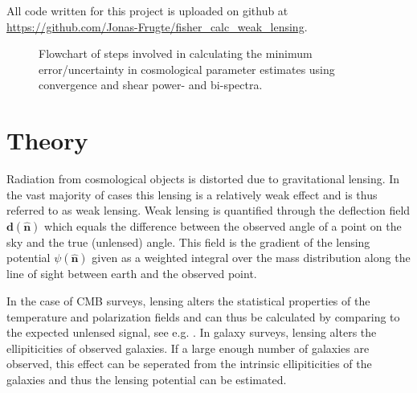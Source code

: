 \documentclass[11pt]{article} %
\begin{document}
All code written for this project is uploaded on github at \url{https://github.com/Jonas-Frugte/fisher_calc_weak_lensing}.



\begin{figure}[h!]
    \centering
    
    \caption{Flowchart of steps involved in calculating the minimum error/uncertainty in cosmological parameter estimates using convergence and shear power- and bi-spectra.}
    \label{fig:flowchart}
\end{figure}

\section{Theory}
Radiation from cosmological objects is distorted due to gravitational lensing. In the vast majority of cases this lensing is a relatively weak effect and is thus referred to as weak lensing. Weak lensing is quantified through the deflection field $\mathbf d(\hat {\mathbf n})$ which equals the difference between the observed angle of a point on the sky and the true (unlensed) angle. This field is the gradient of the lensing potential $\psi(\hat {\mathbf n})$ given as a weighted integral over the mass distribution along the line of sight between earth and the observed point.

In the case of CMB surveys, lensing alters the statistical properties of the temperature and polarization fields and can thus be calculated by comparing to the expected unlensed signal, see e.g. \cite{cmblensingestimator}. In galaxy surveys, lensing alters the ellipiticities of observed galaxies. If a large enough number of galaxies are observed, this effect can be seperated from the intrinsic ellipiticities of the galaxies and thus the lensing potential can be estimated.
\end{document}
